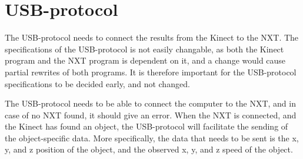 \section{USB-protocol}
The USB-protocol needs to connect the results from the Kinect to the NXT. The specifications of the USB-protocol is not easily changable, as both the Kinect program and the NXT program is dependent on it, and a change would cause partial rewrites of both programs. It is therefore important for the USB-protocol specifications to be decided early, and not changed.

The USB-protocol needs to be able to connect the computer to the NXT, and in case of no NXT found, it should give an error.
When the NXT is connected, and the Kinect has found an object, the USB-protocol will facilitate the sending of the object-specific data.
More specifically, the data that needs to be sent is the x, y, and z position of the object, and the observed x, y, and z speed of the object.